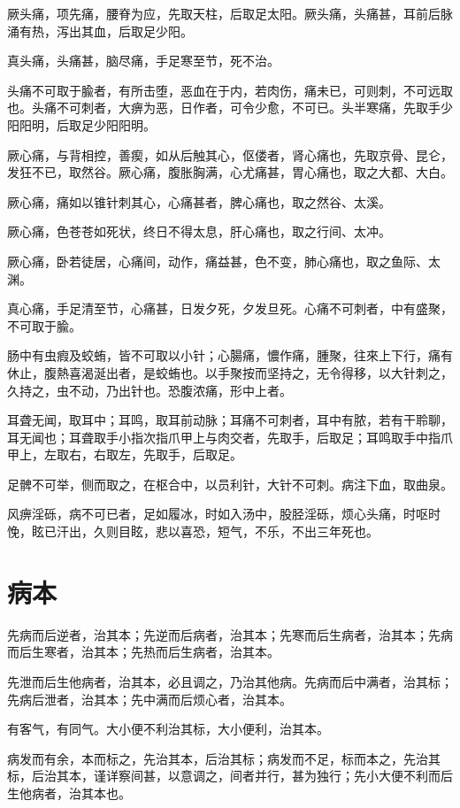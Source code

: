 \documentclass[12pt,UTF8]{ctexbook}
\begin{document}
	厥头痛，项先痛，腰脊为应，先取天柱，后取足太阳。厥头痛，头痛甚，耳前后脉涌有热，泻出其血，后取足少阳。
	
	真头痛，头痛甚，脑尽痛，手足寒至节，死不治。
	
	头痛不可取于腧者，有所击堕，恶血在于内，若肉伤，痛未已，可则刺，不可远取也。头痛不可刺者，大痹为恶，日作者，可令少愈，不可已。头半寒痛，先取手少阳阳明，后取足少阳阳明。
	
	厥心痛，与背相控，善瘈，如从后触其心，伛偻者，肾心痛也，先取京骨、昆仑，发狂不已，取然谷。厥心痛，腹胀胸满，心尤痛甚，胃心痛也，取之大都、大白。
	
	厥心痛，痛如以锥针刺其心，心痛甚者，脾心痛也，取之然谷、太溪。
	
	厥心痛，色苍苍如死状，终日不得太息，肝心痛也，取之行间、太冲。
	
	厥心痛，卧若徒居，心痛间，动作，痛益甚，色不变，肺心痛也，取之鱼际、太渊。
	
	真心痛，手足清至节，心痛甚，日发夕死，夕发旦死。心痛不可刺者，中有盛聚，不可取于腧。
	
	肠中有虫瘕及蛟蛕，皆不可取以小针；心腸痛，憹作痛，腫聚，往來上下行，痛有休止，腹熱喜渴涎出者，是蛟蛕也。以手聚按而坚持之，无令得移，以大针刺之，久持之，虫不动，乃出针也。恐腹浓痛，形中上者。
	
	耳聋无闻，取耳中；耳鸣，取耳前动脉；耳痛不可刺者，耳中有脓，若有干聆聊，耳无闻也；耳聋取手小指次指爪甲上与肉交者，先取手，后取足；耳鸣取手中指爪甲上，左取右，右取左，先取手，后取足。
	
	足髀不可举，侧而取之，在枢合中，以员利针，大针不可刺。病注下血，取曲泉。
	
	风痹淫砾，病不可已者，足如履冰，时如入汤中，股胫淫砾，烦心头痛，时呕时悗，眩已汗出，久则目眩，悲以喜恐，短气，不乐，不出三年死也。
	\chapter{病本}
	
	先病而后逆者，治其本；先逆而后病者，治其本；先寒而后生病者，治其本；先病而后生寒者，治其本；先热而后生病者，治其本。
	
	先泄而后生他病者，治其本，必且调之，乃治其他病。先病而后中满者，治其标；先病后泄者，治其本；先中满而后烦心者，治其本。
	
	有客气，有同气。大小便不利治其标，大小便利，治其本。
	
	病发而有余，本而标之，先治其本，后治其标；病发而不足，标而本之，先治其标，后治其本，谨详察间甚，以意调之，间者并行，甚为独行；先小大便不利而后生他病者，治其本也。
\end{document}
